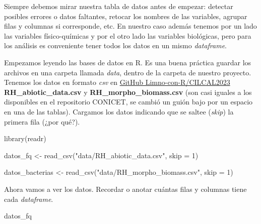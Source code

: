 \documentclass[
]{book}
\newenvironment{Shaded}{\begin{snugshade}}{\end{snugshade}}
\newcommand{\AttributeTok}[1]{\textcolor[rgb]{0.77,0.63,0.00}{#1}}
\newcommand{\DecValTok}[1]{\textcolor[rgb]{0.00,0.00,0.81}{#1}}
\newcommand{\FunctionTok}[1]{\textcolor[rgb]{0.00,0.00,0.00}{#1}}
\newcommand{\NormalTok}[1]{#1}
\newcommand{\OtherTok}[1]{\textcolor[rgb]{0.56,0.35,0.01}{#1}}
\newcommand{\StringTok}[1]{\textcolor[rgb]{0.31,0.60,0.02}{#1}}
\begin{document}
Siempre debemos mirar nuestra tabla de datos antes de empezar: detectar posibles errores o datos faltantes, retocar los nombres de las variables, agrupar filas y columnas si corresponde, etc. En nuestro caso además tenemos por un lado las variables físico-químicas y por el otro lado las variables biológicas, pero para los análisis es conveniente tener todos los datos en un mismo \emph{dataframe}.

Empezamos leyendo las bases de datos en R. Es una buena práctica guardar los archivos en una carpeta llamada \emph{data}, dentro de la carpeta de nuestro proyecto. Tenemos los datos en formato \emph{csv} en \href{https://github.com/Limno-con-R/CILCAL2023/tree/main/datasets}{GitHub Limno-con-R/CILCAL2023} \textbf{RH\_abiotic\_data.csv} y \textbf{RH\_morpho\_biomass.csv} (son casi iguales a los disponibles en el repositorio CONICET, se cambió un guión bajo por un espacio en una de las tablas). Cargamos los datos indicando que se saltee (\emph{skip}) la primera fila (¿por qué?).

\begin{Shaded}
\begin{Highlighting}[]
\FunctionTok{library}\NormalTok{(readr)}

\NormalTok{datos\_fq }\OtherTok{\textless{}{-}} \FunctionTok{read\_csv}\NormalTok{(}\StringTok{"data/RH\_abiotic\_data.csv"}\NormalTok{, }\AttributeTok{skip =} \DecValTok{1}\NormalTok{)}

\NormalTok{datos\_bacterias }\OtherTok{\textless{}{-}} \FunctionTok{read\_csv}\NormalTok{(}\StringTok{"data/RH\_morpho\_biomass.csv"}\NormalTok{, }\AttributeTok{skip =} \DecValTok{1}\NormalTok{)}
\end{Highlighting}
\end{Shaded}

Ahora vamos a ver los datos. Recordar o anotar cuántas filas y columnas tiene cada \emph{dataframe}.

\begin{Shaded}
\begin{Highlighting}[]
\NormalTok{datos\_fq}
\end{Highlighting}
\end{Shaded}
\end{document}

